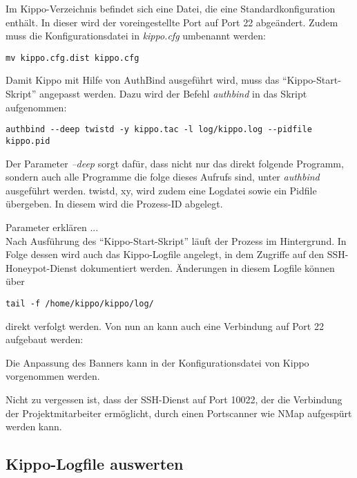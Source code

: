 Im Kippo-Verzeichnis befindet sich eine Datei, die eine Standardkonfiguration enthält. In dieser wird der  voreingestellte Port auf Port 22 abgeändert. Zudem muss die Konfigurationsdatei in \textit{kippo.cfg} umbenannt werden:

\begin{lstlisting}[style=customc]
mv kippo.cfg.dist kippo.cfg
\end{lstlisting}

Damit Kippo mit Hilfe von AuthBind ausgeführt wird, muss das "`Kippo-Start-Skript"' angepasst werden. Dazu wird der Befehl \textit{authbind} in das Skript aufgenommen:

\begin{lstlisting}[style=customc]
authbind --deep twistd -y kippo.tac -l log/kippo.log --pidfile kippo.pid
\end{lstlisting}

Der Parameter \textit{--deep} sorgt dafür, dass nicht nur das direkt folgende Programm, sondern auch alle Programme die folge dieses Aufrufs sind, unter \textit{authbind} ausgeführt werden. twistd, xy, wird zudem eine Logdatei sowie ein Pidfile übergeben. In diesem wird die Prozess-ID abgelegt.

Parameter erklären ...\\

Nach Ausführung des "`Kippo-Start-Skript"' läuft der Prozess im Hintergrund. In Folge dessen wird auch das Kippo-Logfile angelegt, in dem Zugriffe auf den SSH-Honeypot-Dienst dokumentiert werden. Änderungen in diesem Logfile können über

\begin{lstlisting}[style=customc]
tail -f /home/kippo/kippo/log/
\end{lstlisting}

direkt verfolgt werden. Von nun an kann auch eine Verbindung auf Port 22 aufgebaut werden:

Die Anpassung des Banners kann in der Konfigurationsdatei von Kippo vorgenommen werden.

Nicht zu vergessen ist, dass der SSH-Dienst auf Port 10022, der die Verbindung der Projektmitarbeiter ermöglicht, durch einen Portscanner wie NMap aufgespürt werden kann.

\subsection{Kippo-Logfile auswerten}
\label{subsec:Kippo-Logfile auswerten}


